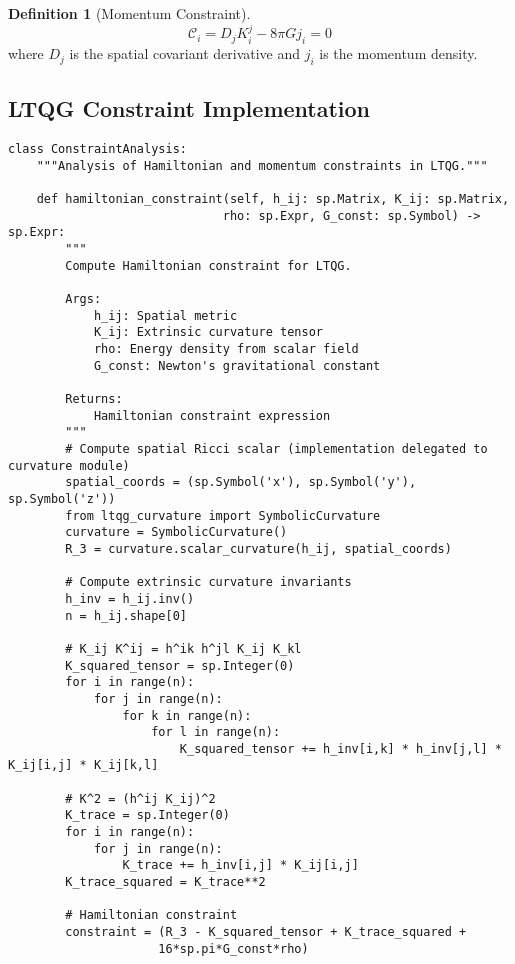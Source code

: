 \documentclass[11pt,a4paper]{article}
\theoremstyle{definition}
\newtheorem{definition}[theorem]{Definition}
\theoremstyle{remark}
\newcommand{\constraint}{\mathcal{C}}
\begin{document}
\begin{definition}[Momentum Constraint]
\begin{equation}
\constraint_i = D_j K^j_i - 8\pi G j_i = 0
\end{equation}
where $D_j$ is the spatial covariant derivative and $j_i$ is the momentum density.
\end{definition}

\subsection{LTQG Constraint Implementation}

\begin{lstlisting}
class ConstraintAnalysis:
    """Analysis of Hamiltonian and momentum constraints in LTQG."""
    
    def hamiltonian_constraint(self, h_ij: sp.Matrix, K_ij: sp.Matrix,
                              rho: sp.Expr, G_const: sp.Symbol) -> sp.Expr:
        """
        Compute Hamiltonian constraint for LTQG.
        
        Args:
            h_ij: Spatial metric
            K_ij: Extrinsic curvature tensor
            rho: Energy density from scalar field
            G_const: Newton's gravitational constant
            
        Returns:
            Hamiltonian constraint expression
        """
        # Compute spatial Ricci scalar (implementation delegated to curvature module)
        spatial_coords = (sp.Symbol('x'), sp.Symbol('y'), sp.Symbol('z'))
        from ltqg_curvature import SymbolicCurvature
        curvature = SymbolicCurvature()
        R_3 = curvature.scalar_curvature(h_ij, spatial_coords)
        
        # Compute extrinsic curvature invariants
        h_inv = h_ij.inv()
        n = h_ij.shape[0]
        
        # K_ij K^ij = h^ik h^jl K_ij K_kl  
        K_squared_tensor = sp.Integer(0)
        for i in range(n):
            for j in range(n):
                for k in range(n):
                    for l in range(n):
                        K_squared_tensor += h_inv[i,k] * h_inv[j,l] * K_ij[i,j] * K_ij[k,l]
        
        # K^2 = (h^ij K_ij)^2
        K_trace = sp.Integer(0)
        for i in range(n):
            for j in range(n):
                K_trace += h_inv[i,j] * K_ij[i,j]
        K_trace_squared = K_trace**2
        
        # Hamiltonian constraint
        constraint = (R_3 - K_squared_tensor + K_trace_squared + 
                     16*sp.pi*G_const*rho)
        

\end{lstlisting}
\end{document}
